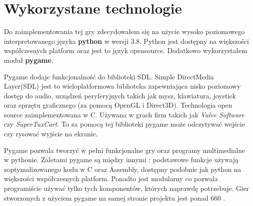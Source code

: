 \documentclass[a4paper, 12pt,oneside]{book}
\begin{document}
\section{Wykorzystane technologie}
Do zaimplementowania tej gry zdecydowałem się na użycie wysoko poziomowego
interpretowanego języka \textbf{python} w wersji 3.8. Python jest dostępny na
większości współczesnych platform oraz jest to język  open\dywiz source.
Dodatkowo wykorzystałem moduł \textbf{pygame}.

Pygame dodaje funkcjonalność do biblioteki SDL. Simple DirectMedia Layer(SDL)
jest to wieloplatformowa biblioteka zapewniająca nisko poziomowy dostęp do
audio, urządzeń peryferyjnych takich jak mysz, klawiatura, joystick oraz
sprzętu graficznego (za pomocą OpenGL i Direct3D). Technologia open source
zaimplementowana w C. Używana w grach firm takich jak \textit{Valve Software}
czy \textit{SuperTuxCart}\cite{sdl_ref}. To za pomocą tej biblioteki pygame
może odczytywać wejście czy rysować wyjście na ekranie.

Pygame pozwala tworzyć w pełni funkcjonalne gry oraz programy multimedialne
w pythonie. Zaletami pygame są między innymi : podstawowe funkcje używają
zoptymalizowanego kodu w C oraz Assembly, dostępny podobnie jak python na
większości współczesnych platform. Ponadto jest modularny co pozwala
programiście używać tylko tych komponentów, których naprawdę potrzebuje.
Gier stworzonych z użyciem pygame na samej stronie projektu jest ponad 660
\cite{pygame_about_ref}.
\end{document}
